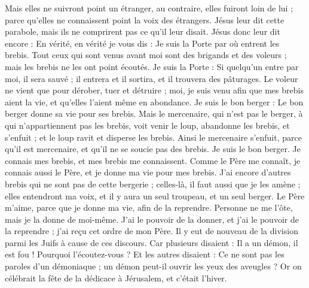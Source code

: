 \begin{multicols}{2}
Mais elles ne suivront point un étranger, au contraire, elles fuiront loin de lui ; parce qu'elles ne connaissent point la voix des étrangers.
Jésus leur dit cette parabole, mais ils ne comprirent pas ce qu'il leur disait.
Jésus donc leur dit encore : En vérité, en vérité je vous dis : Je suis la Porte par où entrent les brebis.
Tout ceux qui sont venus avant moi sont des brigands et des voleurs ; mais les brebis ne les ont point écoutés.
Je suis la Porte : Si quelqu'un entre par moi, il sera sauvé ; il entrera et il sortira, et il trouvera des pâturages.
Le voleur ne vient que pour dérober, tuer et détruire ; moi, je suis venu afin que mes brebis aient la vie, et qu'elles l'aient même en abondance.
Je suis le bon berger : Le bon berger donne sa vie pour ses brebis.
Mais le mercenaire, qui n'est pas le berger, à qui n'appartiennent pas les brebis, voit venir le loup, abandonne les brebis, et s'enfuit ; et le loup ravit et disperse les brebis.
Ainsi le mercenaire s'enfuit, parce qu'il est mercenaire, et qu'il ne se soucie pas des brebis. Je suis le bon berger.
Je connais mes brebis, et mes brebis me connaissent.
Comme le Père me connaît, je connais aussi le Père, et je donne ma vie pour mes brebis.
J'ai encore d'autres brebis qui ne sont pas de cette bergerie ; celles-là, il faut aussi que je les amène ; elles entendront ma voix, et il y aura un seul troupeau, et un seul berger.
Le Père m'aime, parce que je donne ma vie, afin de la reprendre.
Personne ne me l'ôte, mais je la donne de moi-même. J'ai le pouvoir de la donner, et j'ai le pouvoir de la reprendre ; j'ai reçu cet ordre de mon Père.
Il y eut de nouveau de la division parmi les Juifs à cause de ces discours.
Car plusieurs disaient : Il a un démon, il est fou ! Pourquoi l'écoutez-vous ?
Et les autres disaient : Ce ne sont pas les paroles d'un démoniaque ; un démon peut-il ouvrir les yeux des aveugles ?
Or on célébrait la fête de la dédicace à Jérusalem, et c'était l'hiver.

\end{multicols}

